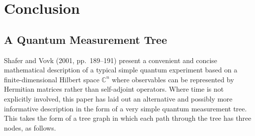 \documentclass[11pt]{article}
\newcommand \C { \mathbb{C} }
\begin{document}
\section{Conclusion} \label{s:conclude}
\subsection{A Quantum Measurement Tree} \label{ss:qmt}

Shafer and Vovk (2001, pp.\ 189--191) present 
a convenient and concise mathematical description 
of a typical simple quantum experiment based on a finite-dimensional Hilbert space $ \C^n $
where observables can be represented by Hermitian matrices rather than self-adjoint operators.
Where time is not explicitly involved, 
this paper has laid out an alternative and possibly more informative description
in the form of a very simple quantum measurement tree.
This takes the form of a tree graph in which each path through the tree has three nodes, 
as follows.
\end{document}
